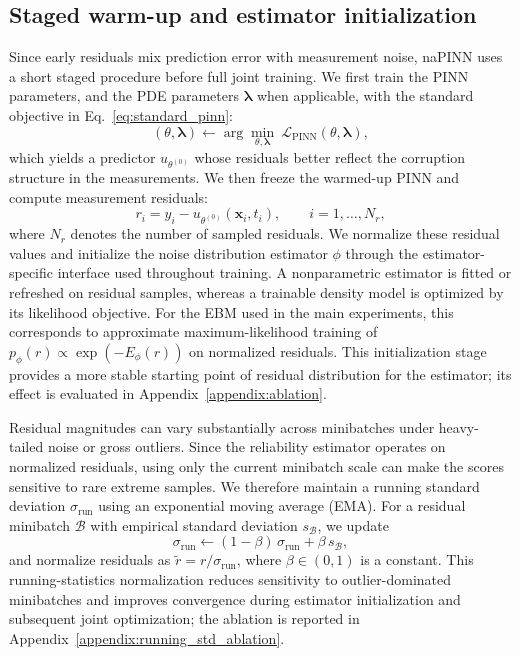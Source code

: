 \documentclass{article}
\theoremstyle{plain}
\theoremstyle{definition}
\theoremstyle{remark}
\begin{document}
\subsection{Staged warm-up and estimator initialization}
\label{subsec:stage1}
Since early residuals mix prediction error with measurement noise, naPINN uses a short staged procedure before full joint training. We first train the PINN parameters, and the PDE parameters $\boldsymbol{\lambda}$ when applicable, with the standard objective in Eq.~\eqref{eq:standard_pinn}:
\begin{equation}
(\theta,\boldsymbol{\lambda}) \leftarrow 
\arg\min_{\theta,\boldsymbol{\lambda}} \ \mathcal{L}_{\text{PINN}}(\theta,\boldsymbol{\lambda}),
\label{eq:warmup}
\end{equation}
which yields a predictor $u_{\theta^{(0)}}$ whose residuals better reflect the corruption structure in the measurements. We then freeze the warmed-up PINN and compute measurement residuals:
\begin{equation}
r_i = y_i - u_{\theta^{(0)}}(\mathbf{x}_i,t_i), \qquad i=1,\dots,N_r,
\end{equation}
where $N_r$ denotes the number of sampled residuals. We normalize these residual values and initialize the noise distribution estimator $\phi$ through the estimator-specific interface used throughout training. A nonparametric estimator is fitted or refreshed on residual samples, whereas a trainable density model is optimized by its likelihood objective. For the EBM used in the main experiments, this corresponds to approximate maximum-likelihood training of $p_\phi(r)\propto \exp(-E_\phi(r))$ on normalized residuals. This initialization stage provides a more stable starting point of residual distribution for the estimator; its effect is evaluated in Appendix~\ref{appendix:ablation}.

Residual magnitudes can vary substantially across minibatches under heavy-tailed noise or gross outliers. Since the reliability estimator operates on normalized residuals, using only the current minibatch scale can make the scores sensitive to rare extreme samples. We therefore maintain a running standard deviation $\sigma_{\text{run}}$ using an exponential moving average (EMA). For a residual minibatch $\mathcal{B}$ with empirical standard deviation $s_{\mathcal{B}}$, we update
\begin{equation}
\sigma_{\text{run}} \leftarrow (1-\beta)\,\sigma_{\text{run}} + \beta\, s_{\mathcal{B}},
\label{eq:ema_std}
\end{equation}
and normalize residuals as $\tilde r = r / \sigma_\text{run}$, where $\beta\in(0,1)$ is a constant. This running-statistics normalization reduces sensitivity to outlier-dominated minibatches and improves convergence during estimator initialization and subsequent joint optimization; the ablation is reported in Appendix~\ref{appendix:running_std_ablation}.
\end{document}
